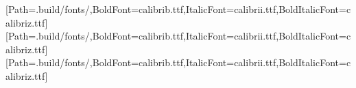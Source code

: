 \providecommand{\GuideFontPath}{.build/fonts/}
\setmainfont{calibri.ttf}[Path=\GuideFontPath,BoldFont=calibrib.ttf,ItalicFont=calibrii.ttf,BoldItalicFont=calibriz.ttf]
\setsansfont{calibri.ttf}[Path=\GuideFontPath,BoldFont=calibrib.ttf,ItalicFont=calibrii.ttf,BoldItalicFont=calibriz.ttf]
\setmonofont{calibri.ttf}[Path=\GuideFontPath,BoldFont=calibrib.ttf,ItalicFont=calibrii.ttf,BoldItalicFont=calibriz.ttf]
